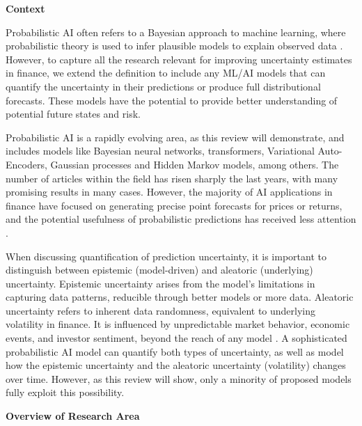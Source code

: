 \textbf{Context}\nopagebreak

Probabilistic AI often refers to a Bayesian approach to machine learning, where probabilistic theory is used to infer plausible models to explain observed data \parencite{Ghahramani2015}. However, to capture all the research relevant for improving uncertainty estimates in finance, we extend the definition to include any ML/AI models that can quantify the uncertainty in their predictions or produce full distributional forecasts. These models have the potential to provide better understanding of potential future states and risk.

Probabilistic AI is a rapidly evolving area, as this review will demonstrate, and includes models like Bayesian neural networks, transformers, Variational Auto-Encoders, Gaussian processes and Hidden Markov models, among others. The number of articles within the field has risen sharply the last years, with many promising results in many cases. However, the majority of AI applications in finance have focused on generating precise point forecasts for prices or returns, and the potential usefulness of probabilistic predictions has received less attention \parencite{sezer2020financial}.

When discussing quantification of prediction uncertainty, it is important to distinguish between epistemic (model-driven) and aleatoric (underlying) uncertainty. Epistemic uncertainty arises from the model's limitations in capturing data patterns, reducible through better models or more data. Aleatoric uncertainty refers to inherent data randomness, equivalent to underlying volatility in finance. It is influenced by unpredictable market behavior, economic events, and investor sentiment, beyond the reach of any model \parencite[7,34]{pml1Book, KIUREGHIAN2009105, hullermeier2021aleatoric}. A sophisticated probabilistic AI model can quantify both types of uncertainty, as well as model how the epistemic uncertainty and the aleatoric uncertainty (volatility) changes over time. However, as this review will show, only a minority of proposed models fully exploit this possibility.



\textbf{Overview of Research Area}\nopagebreak

